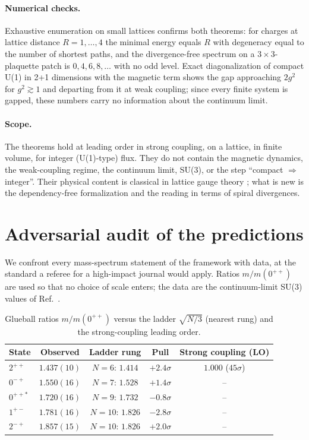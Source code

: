 \documentclass[aps,prd,preprint,superscriptaddress,amsmath,amssymb]{revtex4-2}
\begin{document}
\paragraph{Numerical checks.}  Exhaustive enumeration on small lattices
confirms both theorems: for charges at lattice distance $R=1,\dots,4$ the
minimal energy equals $R$ with degeneracy equal to the number of shortest
paths, and the divergence-free spectrum on a $3\times3$-plaquette patch is
$0,4,6,8,\dots$ with no odd level.  Exact diagonalization of compact U(1) in
2+1 dimensions with the magnetic term shows the gap approaching $2g^2$ for
$g^2\gtrsim1$ and departing from it at weak coupling; since every finite system
is gapped, these numbers carry no information about the continuum limit.

\paragraph{Scope.}  The theorems hold at leading order in strong coupling, on a
lattice, in finite volume, for integer (U(1)-type) flux.  They do not contain
the magnetic dynamics, the weak-coupling regime, the continuum limit, SU(3),
or the step ``compact $\Rightarrow$ integer''.  Their physical content is
classical in lattice gauge theory \cite{wilson1974confinement,
kogut1975hamiltonian,osterwalder1978gauge,munster1981strong}; what is new is
the dependency-free formalization and the reading in terms of spiral
divergences.

\section{Adversarial audit of the predictions}
\label{sec:audit}

We confront every mass-spectrum statement of the framework with data, at the
standard a referee for a high-impact journal would apply.  Ratios
$m/m(0^{++})$ are used so that no choice of scale enters; the data are the
continuum-limit SU(3) values of Ref.~\cite{athenodorou2020glueball}.

\begin{table}[h]
\caption{\label{tab:audit} Glueball ratios $m/m(0^{++})$ versus the ladder
$\sqrt{N/3}$ (nearest rung) and the strong-coupling leading order.}
\begin{ruledtabular}
\begin{tabular}{lcccc}
State & Observed & Ladder rung & Pull & Strong coupling (LO)\\
\hline
$2^{++}$ & $1.437(10)$ & $N=6$: $1.414$ & $+2.4\sigma$ & $1.000$ ($45\sigma$)\\
$0^{-+}$ & $1.550(16)$ & $N=7$: $1.528$ & $+1.4\sigma$ & --\\
$0^{++*}$ & $1.720(16)$ & $N=9$: $1.732$ & $-0.8\sigma$ & --\\
$1^{+-}$ & $1.781(16)$ & $N=10$: $1.826$ & $-2.8\sigma$ & --\\
$2^{-+}$ & $1.857(15)$ & $N=10$: $1.826$ & $+2.0\sigma$ & --\\
\end{tabular}
\end{ruledtabular}
\end{table}
\end{document}
